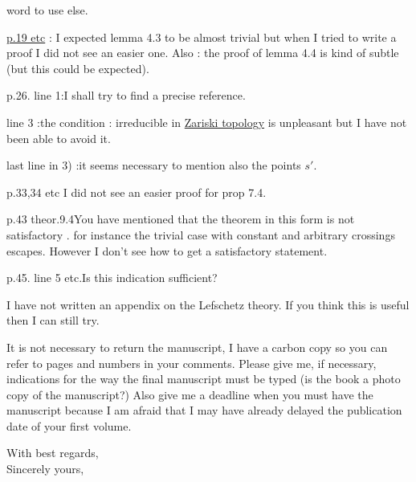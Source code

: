 word to use else.

\uline{p.19 etc} : I expected lemma 4.3 to be almost trivial but when I tried to write a proof I did not see an easier one. Also : the proof of lemma 4.4 is kind of subtle (but this could be expected).
\margin{!}

p.26. line 1:\quad I shall try to find a precise reference.

line 3 :\quad the condition : irreducible in \uline{Zariski topology} is unpleasant but I have not been able to avoid it.

last line in 3) :\quad it seems necessary to mention also the points $s'$.

p.33,34 etc \quad I did not see an easier proof for prop 7.4.

p.43 theor.9.4\quad You have mentioned that the theorem in this form is not satisfactory . for instance the trivial case with constant  and arbitrary crossings escapes. However I don't see how to get a satisfactory statement.

p.45. line 5 etc.\quad Is this indication sufficient?

I have not written an appendix on the Lefschetz theory. If you think this is useful then I can still try.

It is not necessary to return the manuscript, I have a carbon copy so you can refer to pages and numbers in your comments. Please give me, if necessary, indications for the way the final manuscript must be typed (is the book a  photo copy of the manuscript?) Also give me a deadline when you must have the manuscript because I am afraid that I may have already delayed the publication date of your first volume.

With best regards,\\
Sincerely yours,\\
\\
